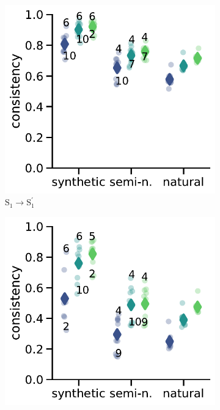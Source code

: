\begin{figure}[!h]
    \centering
    \begin{subfigure}[b]{0.45\columnwidth}
        \includegraphics[width=\columnwidth]{figures/systematicity/s1p.pdf}
        \caption{$\text{S}_1 \rightarrow \text{S}_1^\prime$}
        \label{fig:systematicity_sconj_s1}
    \end{subfigure}
    \begin{subfigure}[b]{0.45\columnwidth}
        \includegraphics[width=\columnwidth]{figures/systematicity/s3.pdf}

\end{subfigure}
\end{figure}
